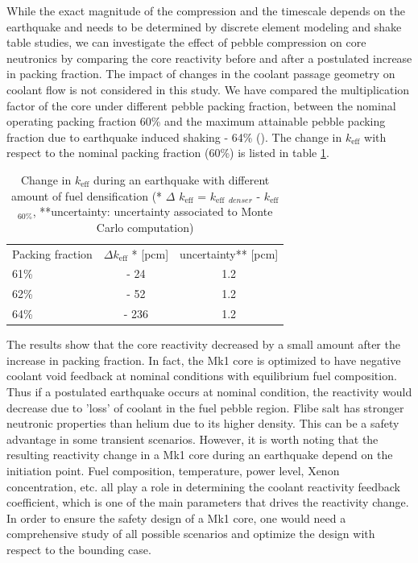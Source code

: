 \documentclass{elsarticle}
\newcommand{\keff}{{\ensuremath{k_{\mathrm{eff}}}} }
\begin{document}
While the exact magnitude of the compression and the timescale depends on the earthquake and needs to be determined by discrete element modeling and shake table studies, we can investigate the effect of pebble compression on core neutronics by comparing the core reactivity before and after a postulated increase in packing fraction. The impact of changes in the coolant passage geometry on coolant flow is not considered in this study.
We have compared the multiplication factor of the core under different pebble packing fraction, between the nominal operating packing fraction 60\% and the maximum attainable pebble packing fraction due to earthquake induced shaking - 64\% (\cite{Radin2008}\cite{Chen2018}). The change in \keff with respect to the nominal packing fraction (60\%) is listed in table \ref{tab:pk_earthquake}. 

\begin{table}[h]
    \centering
    \begin{tabular}{lcc}
      Packing fraction   & $\Delta$\keff* [pcm] & uncertainty** [pcm]\\
        61\% & - 24 & 1.2\\
        62\% & - 52 & 1.2\\
        64\% & - 236 & 1.2\\
    \end{tabular}
    \caption{Change in \keff during an earthquake with different amount of fuel densification (* $\Delta$ \keff = \keff$_{denser}$ - \keff$_{60\%}$,  **uncertainty: uncertainty associated to Monte Carlo computation)}
    \label{tab:pk_earthquake}
\end{table}

The results show that the core reactivity decreased by a small amount after the increase in packing fraction.
In fact, the Mk1 core is optimized to have negative coolant void feedback at nominal conditions with equilibrium fuel composition. Thus if a postulated earthquake occurs at nominal condition, the reactivity would decrease due to 'loss' of coolant in the fuel pebble region.
Flibe salt has stronger neutronic properties than helium due to its higher density. This can be a safety advantage in some transient scenarios. 
However, it is worth noting that the resulting reactivity change in a Mk1 core during an earthquake depend on the initiation point. Fuel composition, temperature, power level, Xenon concentration, etc. all play a role in determining the coolant reactivity feedback coefficient, which is one of the main parameters that drives the reactivity change. In order to ensure the safety design of a Mk1 core, one would need a comprehensive study of all possible scenarios and optimize the design with respect to the bounding case.
\end{document}
